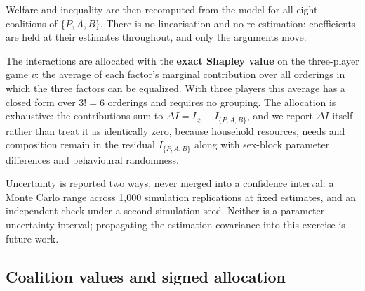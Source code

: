 \documentclass[11pt,a4paper]{article}
\begin{document}
Welfare and inequality are then recomputed from the model for all eight coalitions of \(\{P,A,B\}\). There is no linearisation and no re-estimation: coefficients are held at their estimates throughout, and only the arguments move.

The interactions are allocated with the \textbf{exact Shapley value} \citep{shorrocks2013} on the three-player game \(v\): the average of each factor's marginal contribution over all orderings in which the three factors can be equalized. With three players this average has a closed form over \(3!=6\) orderings and requires no grouping. The allocation is exhaustive: the contributions sum to \(\Delta I=I_\varnothing-I_{\{P,A,B\}}\), and we report \(\Delta I\) itself rather than treat it as identically zero, because household resources, needs and composition remain in the residual \(I_{\{P,A,B\}}\) along with sex-block parameter differences and behavioural randomness.

Uncertainty is reported two ways, never merged into a confidence interval: a Monte Carlo range across 1,000 simulation replications at fixed estimates, and an independent check under a second simulation seed. Neither is a parameter-uncertainty interval; propagating the estimation covariance into this exercise is future work.

\subsection{Coalition values and signed allocation}\label{coalition-values-and-signed-allocation}
\end{document}
